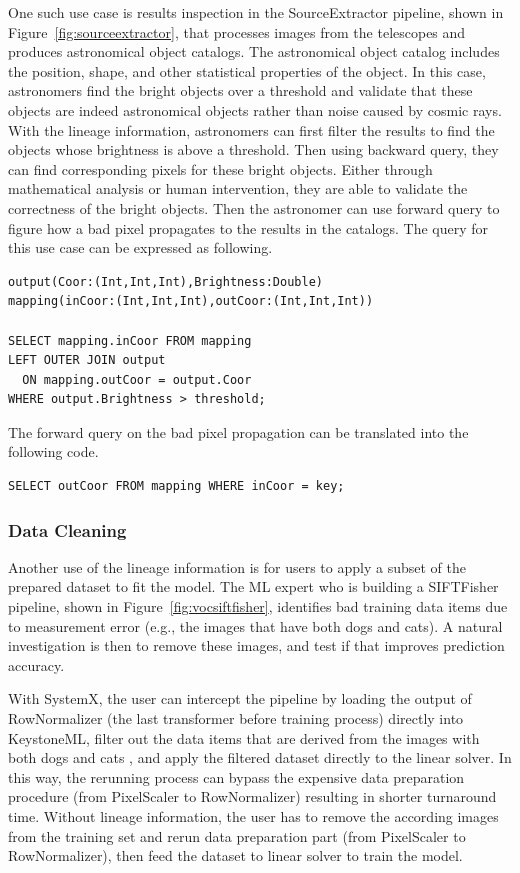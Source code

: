 \documentclass{sig-alternate}
\begin{document}
One such use case is results inspection in the SourceExtractor pipeline, shown in Figure~\ref{fig:sourceextractor},
that processes images from the telescopes and produces astronomical object catalogs. 
The astronomical object catalog includes the position, shape, and other statistical properties of the object.
In this case, astronomers find the bright objects over a threshold and validate that these objects are indeed astronomical objects rather
than noise caused by cosmic rays.
With the lineage information, astronomers can first filter the results to find the objects whose brightness is above a threshold.
Then using backward query, they can find corresponding pixels for these bright objects. 
Either through mathematical analysis or human intervention, they are able to validate the correctness of the bright objects.
Then the astronomer can use forward query to figure how a bad pixel propagates to the results in the catalogs.
The query for this use case can be expressed as following.
\begin{lstlisting}
output(Coor:(Int,Int,Int),Brightness:Double)
mapping(inCoor:(Int,Int,Int),outCoor:(Int,Int,Int))

SELECT mapping.inCoor FROM mapping 
LEFT OUTER JOIN output
  ON mapping.outCoor = output.Coor
WHERE output.Brightness > threshold;
\end{lstlisting}

The forward query on the bad pixel propagation can be translated into the following code.
\begin{lstlisting}
SELECT outCoor FROM mapping WHERE inCoor = key;
\end{lstlisting}

\subsubsection{Data Cleaning}
\label{sec:Back-Case-Cleaning}
Another use of the lineage information is for users to apply a subset of the prepared dataset to fit the model. 
The ML expert who is building a SIFTFisher pipeline, shown in Figure~\ref{fig:vocsiftfisher}, identifies bad 
training data items due to measurement error (e.g., the images that have both dogs and cats). A natural 
investigation is then to remove these images, and test if that improves prediction accuracy.

With SystemX, the user can intercept the pipeline by loading the output of RowNormalizer (the last transformer before training process) 
directly into KeystoneML, filter out the data items that are derived from the images with both dogs and cats , 
and apply the filtered dataset directly to the linear solver.
In this way, the rerunning process can bypass the expensive data preparation procedure (from PixelScaler to RowNormalizer) 
resulting in shorter turnaround time.
Without lineage information, the user has to remove the according images from the training set and rerun data
preparation part (from PixelScaler to RowNormalizer), then feed the dataset to linear solver to train the model.
\end{document}

